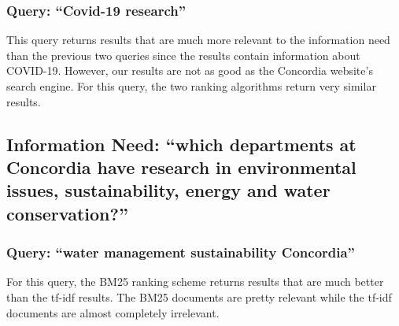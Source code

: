 \documentclass[]{article}
\begin{document}
\subsubsection{Query: ``Covid-19 research''}
This query returns results that are much more relevant to the information need than the previous two queries since the results contain information about COVID-19. However, our results are  not as good as the Concordia website's search engine. For this query, the two ranking algorithms return very similar results.


\subsection{Information Need: ``which departments at Concordia have research in environmental issues, sustainability, energy and water conservation?''}

\subsubsection{Query: ``water management sustainability Concordia''}
For this query, the BM25 ranking scheme returns results that are much better than the tf-idf results. The BM25 documents are pretty relevant while the tf-idf documents are almost completely irrelevant. 
\end{document}
